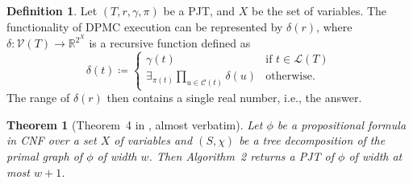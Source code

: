 \documentclass{article}
\newtheorem{theorem}{Theorem}
\theoremstyle{definition}
\newtheorem{definition}{Definition}
\theoremstyle{remark}
\begin{document}
\begin{definition} \label{def:abstraction}
  Let $(T, r, \gamma, \pi)$ be a PJT, and $X$ be the set of variables. The
  functionality of \textsc{DPMC} execution can be represented by $\delta(r)$,
  where $\delta\colon \mathcal{V}(T) \to \mathbb{R}^{2^X}$ is a recursive
  function defined as
  \begin{equation} \label{eq:execution}
    \delta(t) \coloneqq
    \begin{cases}
      \gamma(t) & \text{if } t \in \mathcal{L}(T) \\
      \exists_{\pi(t)} \prod_{u \in \mathcal{C}(t)} \delta(u) & \text{otherwise.}
    \end{cases}
  \end{equation}
  The range of $\delta(r)$ then contains a single real number, i.e., the answer.
\end{definition}

\begin{theorem}[Theorem~4 in \cite{DBLP:conf/cp/DudekPV20}, almost
  verbatim] \label{thm:connection}
  Let $\phi$ be a propositional formula in CNF over a set $X$ of variables and
  $(S, \chi)$ be a tree decomposition of the primal graph of $\phi$ of width
  $w$. Then Algorithm~2 returns a PJT of $\phi$ of width at most $w+1$.
\end{theorem}
\end{document}
